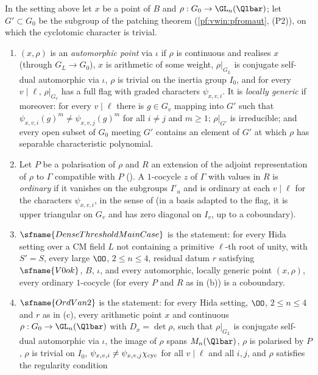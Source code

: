 \begin{definition}\label{pf:modularity:coredef}
In the setting above let $x$ be a point of $B$ and $\rho:G_0\to\GL_n(\Qlbar)$; let $G'\subset G_0$ be the subgroup of the
patching theorem (\cref{pf:vwin:pfromaut}, (P2)), on which the cyclotomic character is trivial.
\begin{enumerate}[label=(\alph*)]
\item $(x,\rho)$ is an \emph{automorphic point} via $\iota$ if $\rho$ is continuous and realises $x$ (through $G_L\to
G_0$), $x$ is arithmetic of some weight, $\rho|_{G_L}$ is conjugate self-dual automorphic via $\iota$, $\rho$ is trivial on
the inertia group $I_0$, and for every $v\mid\ell$, $\rho|_{G_v}$ has a full flag with graded characters $\psi_{x,v,i}$. It
is \emph{locally generic} if moreover: for every $v\mid\ell$ there is $g\in G_v$ mapping into $G'$ such that
$\psi_{x,v,i}(g)^m\ne\psi_{x,v,j}(g)^m$ for all $i\ne j$ and $m\ge1$; $\rho|_{G'}$ is irreducible; and every open subset
of $G_0$ meeting $G'$ contains an element of $G'$ at which $\rho$ has separable characteristic polynomial.
\item Let $P$ be a polarisation of $\rho$ and $R$ an extension of the adjoint representation of $\rho$ to $\Gamma$
compatible with $P$ (). A $1$-cocycle $z$ of $\Gamma$ with values in $R$ is
\emph{ordinary} if it vanishes on the subgroups $I'_u$ and is ordinary at each $v\mid\ell$ for the
characters $\psi_{x,v,i}$, in the sense of \cite{LeanSource2026} (in a basis adapted to the flag, it is upper triangular
on $G_v$ and has zero diagonal on $I_v$, up to a coboundary).
\item $\sfname{DenseThresholdMainCase}$ is the statement: for every Hida setting over a CM field $L$ not containing a
primitive $\ell$-th root of unity, with $S'=S$, every large $\OO$, $2\le n\le4$, residual datum $r$ satisfying
$\sfname{V0ok}$, $B$, $\iota$, and every automorphic, locally generic point $(x,\rho)$, every ordinary $1$-cocycle (for every
$P$ and $R$ as in (b)) is a coboundary.
\item $\sfname{OrdVan2}$ is the statement: for every Hida setting, $\OO$, $2\le n\le4$ and $r$ as in (c), every arithmetic
point $x$ and continuous $\rho:G_0\to\GL_n(\Qlbar)$ with $D_x=\det\rho$, such that $\rho|_{G_L}$ is conjugate self-dual
automorphic via $\iota$, the image of $\rho$ spans $M_n(\Qlbar)$, $\rho$ is polarised by $P$, $\rho$ is trivial on $I_0$,
$\psi_{x,v,i}\ne\psi_{x,v,j}\chi_{\mathrm{cyc}}$ for all $v\mid\ell$ and all $i,j$, and $\rho$ satisfies the regularity condition

\end{enumerate}
\end{definition}
